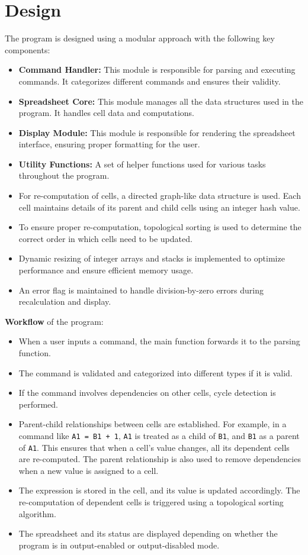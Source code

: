 \documentclass{article}
\begin{document}
\section{Design}
The program is designed using a modular approach with the following key components:
\begin{itemize}
    \item \textbf{Command Handler:} This module is responsible for parsing and executing commands. It categorizes different commands and ensures their validity.
    \item \textbf{Spreadsheet Core:} This module manages all the data structures used in the program. It handles cell data and computations.
    \item \textbf{Display Module:} This module is responsible for rendering the spreadsheet interface, ensuring proper formatting for the user.
    \item \textbf{Utility Functions:} A set of helper functions used for various tasks throughout the program.
    \item For re-computation of cells, a directed graph-like data structure is used. Each cell maintains details of its parent and child cells using an integer hash value.
    \item To ensure proper re-computation, topological sorting is used to determine the correct order in which cells need to be updated.
    \item Dynamic resizing of integer arrays and stacks is implemented to optimize performance and ensure efficient memory usage.
    \item An error flag is maintained to handle division-by-zero errors during recalculation and display.
\end{itemize}

\textbf{Workflow} of the program:
\begin{itemize}
    \item When a user inputs a command, the main function forwards it to the parsing function.
    \item The command is validated and categorized into different types if it is valid.
    \item If the command involves dependencies on other cells, cycle detection is performed.
    \item Parent-child relationships between cells are established. For example, in a command like \texttt{A1 = B1 + 1}, \texttt{A1} is treated as a child of \texttt{B1}, and \texttt{B1} as a parent of \texttt{A1}. This ensures that when a cell's value changes, all its dependent cells are re-computed. The parent relationship is also used to remove dependencies when a new value is assigned to a cell.
    \item The expression is stored in the cell, and its value is updated accordingly. The re-computation of dependent cells is triggered using a topological sorting algorithm.
    \item The spreadsheet and its status are displayed depending on whether the program is in output-enabled or output-disabled mode.
\end{itemize}
\end{document}
